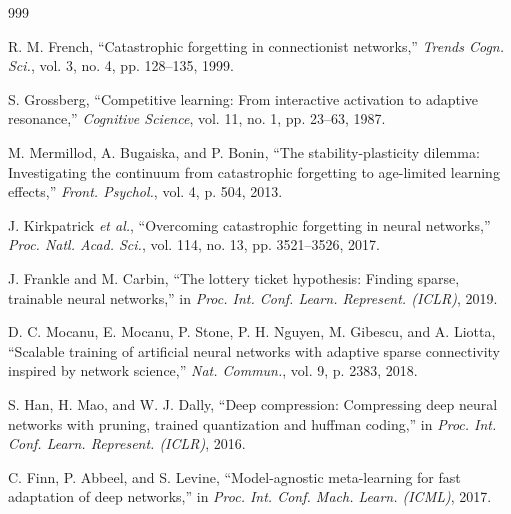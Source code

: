 \documentclass[12pt,a4paper,oneside]{report}
\begin{document}
\begin{thebibliography}{999}

R. M. French, ``Catastrophic forgetting in connectionist networks,'' \textit{Trends Cogn. Sci.}, vol. 3, no. 4, pp. 128--135, 1999.




S. Grossberg, ``Competitive learning: From interactive activation to adaptive resonance,'' \textit{Cognitive Science}, vol. 11, no. 1, pp. 23--63, 1987.




M. Mermillod, A. Bugaiska, and P. Bonin, ``The stability-plasticity dilemma: Investigating the continuum from catastrophic forgetting to age-limited learning effects,'' \textit{Front. Psychol.}, vol. 4, p. 504, 2013.




J. Kirkpatrick \textit{et al.}, ``Overcoming catastrophic forgetting in neural networks,'' \textit{Proc. Natl. Acad. Sci.}, vol. 114, no. 13, pp. 3521--3526, 2017.




J. Frankle and M. Carbin, ``The lottery ticket hypothesis: Finding sparse, trainable neural networks,'' in \textit{Proc. Int. Conf. Learn. Represent. (ICLR)}, 2019.




D. C. Mocanu, E. Mocanu, P. Stone, P. H. Nguyen, M. Gibescu, and A. Liotta, ``Scalable training of artificial neural networks with adaptive sparse connectivity inspired by network science,'' \textit{Nat. Commun.}, vol. 9, p. 2383, 2018.




S. Han, H. Mao, and W. J. Dally, ``Deep compression: Compressing deep neural networks with pruning, trained quantization and huffman coding,'' in \textit{Proc. Int. Conf. Learn. Represent. (ICLR)}, 2016.




C. Finn, P. Abbeel, and S. Levine, ``Model-agnostic meta-learning for fast adaptation of deep networks,'' in \textit{Proc. Int. Conf. Mach. Learn. (ICML)}, 2017.




\end{thebibliography}
\end{document}
